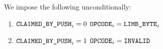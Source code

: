 We impose the following unconditionally:
\begin{enumerate}
        \item \If $\texttt{CLAIMED\_BY\_PUSH} _{i} = 0$ \Then $\texttt{OPCODE} _{i} = \texttt{LIMB\_BYTE} _{i}$
        \item \If $\texttt{CLAIMED\_BY\_PUSH} _{i} = 1$ \Then $\texttt{OPCODE} _{i} = \texttt{INVALID}$
\end{enumerate}
